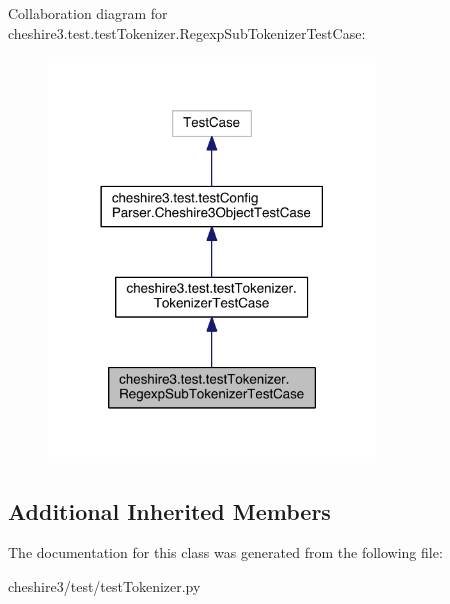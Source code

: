 Collaboration diagram for cheshire3.\-test.\-test\-Tokenizer.\-Regexp\-Sub\-Tokenizer\-Test\-Case\-:
\nopagebreak
\begin{figure}[H]
\begin{center}
\leavevmode
\includegraphics[width=246pt]{classcheshire3_1_1test_1_1test_tokenizer_1_1_regexp_sub_tokenizer_test_case__coll__graph}
\end{center}
\end{figure}
\subsection*{Additional Inherited Members}


The documentation for this class was generated from the following file\-:\begin{DoxyCompactItemize}
\item 
cheshire3/test/test\-Tokenizer.\-py\end{DoxyCompactItemize}
